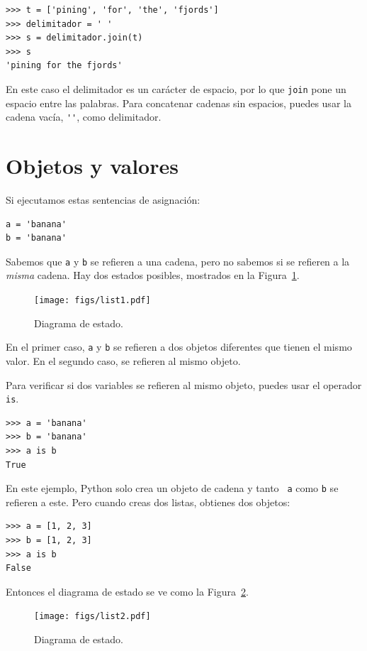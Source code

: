 \documentclass[10pt]{book}
\begin{document}
\begin{verbatim}
>>> t = ['pining', 'for', 'the', 'fjords']
>>> delimitador = ' '
>>> s = delimitador.join(t)
>>> s
'pining for the fjords'
\end{verbatim}
%
En este caso el delimitador es un carácter de espacio, por lo que
{\tt join} pone un espacio entre las palabras.  Para concatenar
cadenas sin espacios, puedes usar la cadena vacía,
\verb"''", como delimitador.


\section{Objetos y valores}
\label{equivalence}

Si ejecutamos estas sentencias de asignación:

\begin{verbatim}
a = 'banana'
b = 'banana'
\end{verbatim}
%
Sabemos que {\tt a} y {\tt b} se refieren a una
cadena, pero no
sabemos si se refieren a la {\em misma} cadena.
Hay dos estados posibles, mostrados en la Figura~\ref{fig.list1}.

\begin{figure}
\centerline
{\texttt{[image: figs/list1.pdf]}}
\caption{Diagrama de estado.}
\label{fig.list1}
\end{figure}

En el primer caso, {\tt a} y {\tt b} se refieren a dos objetos diferentes que
tienen el mismo valor.  En el segundo caso, se refieren al mismo
objeto.

Para verificar si dos variables se refieren al mismo objeto, puedes
usar el operador {\tt is}.

\begin{verbatim}
>>> a = 'banana'
>>> b = 'banana'
>>> a is b
True
\end{verbatim}
%
En este ejemplo, Python solo crea un objeto de cadena y tanto {\tt
  a} como {\tt b} se refieren a este.  Pero cuando creas dos listas, obtienes
dos objetos:

\begin{verbatim}
>>> a = [1, 2, 3]
>>> b = [1, 2, 3]
>>> a is b
False
\end{verbatim}
%
Entonces el diagrama de estado se ve como la Figura~\ref{fig.list2}.

\begin{figure}
\centerline
{\texttt{[image: figs/list2.pdf]}}
\caption{Diagrama de estado.}
\label{fig.list2}
\end{figure}
\end{document}
